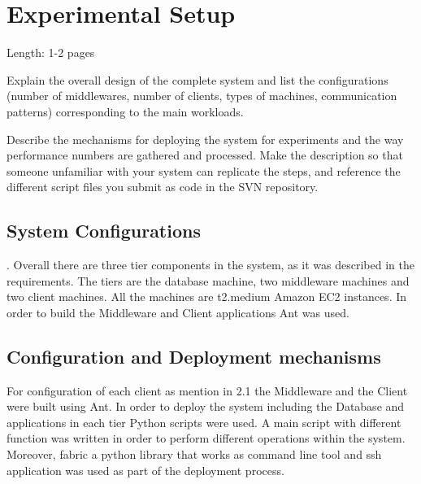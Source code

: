 \section{Experimental Setup}\label{sec:experimental-setup}

Length: 1-2 pages

Explain the overall design of the complete system and list the
configurations (number of middlewares, number of clients, types of
machines, communication patterns) corresponding to the main workloads.

Describe the mechanisms for deploying the system for experiments and the
way performance numbers are gathered and processed. Make the description
so that someone unfamiliar with your system can replicate the steps, and
reference the different script files you submit as code in the SVN
repository.

\subsection{System Configurations}\label{sec:system-configurations}
.	Overall there are three tier components in the system, as it was described in the requirements. The tiers are the database machine, two middleware machines and two client machines. All the machines are t2.medium Amazon EC2 instances. In order to build the Middleware and Client applications Ant was used.
\subsection{Configuration and Deployment mechanisms}\label{sec:configuration-and-deployment-mechanisms}
For configuration of each client as mention in 2.1 the Middleware and the Client were built using Ant. In order to deploy the system including the Database and applications in each tier Python scripts were used. A main script with different function was written in order to perform different operations within the system. Moreover, fabric a python library that works as command line tool and ssh application was used as part of the deployment process.
